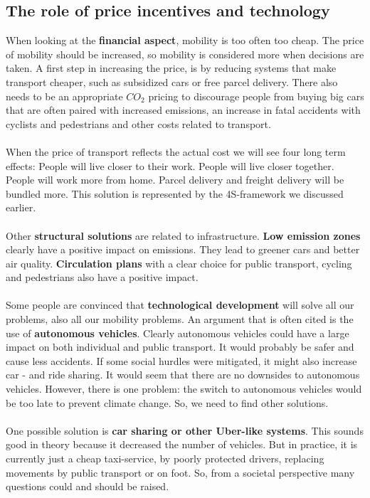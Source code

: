 \documentclass[../summary.tex]{subfiles}
\begin{document}
	\subsection{The role of price incentives and technology}
	
	When looking at the \textbf{financial aspect}, mobility is too often too cheap. The price of mobility should be increased, so mobility is considered more when decisions are taken. A first step in increasing the price, is by reducing systems that make transport cheaper, such as subsidized cars or free parcel delivery. There also needs to be an appropriate $CO_{2}$ pricing to discourage people from buying big cars that are often paired with increased emissions, an increase in fatal accidents with cyclists and pedestrians and other costs related to transport. 
	\\\\
	When the price of transport reflects the actual cost we will see four long term effects: People will live closer to their work. People will live closer together. People will work more from home. Parcel delivery and freight delivery will be bundled more. This solution is represented by the 4S-framework we discussed earlier. 
	\\\\
	Other \textbf{structural solutions} are related to infrastructure. \textbf{Low emission zones} clearly have a positive impact on emissions. They lead to greener cars and better air quality. \textbf{Circulation plans} with a clear choice for public transport, cycling and pedestrians also have a positive impact. 
	\\\\
	 Some people are convinced that \textbf{technological development} will solve all our problems, also all our mobility problems. An argument that is often  cited is the use of  \textbf{autonomous vehicles}. Clearly autonomous vehicles could have a large impact on both individual and public transport. It would probably be safer and cause less accidents. If some social hurdles were mitigated, it might also increase car - and ride sharing. It would seem that there are no downsides to autonomous vehicles. However, there is one problem: the switch to autonomous vehicles would be too late to prevent climate change. So, we need to find other solutions.
	 \\\\
	 One possible solution is \textbf{car sharing or other Uber-like systems}. This sounds good in theory because it decreased the number of vehicles. But in practice, it is currently just a cheap taxi-service, by poorly protected drivers, replacing movements by public transport or on foot. So, from a societal perspective many questions could and should be raised.
\end{document}
